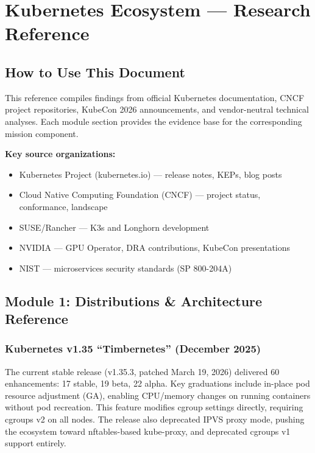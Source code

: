 \documentclass[11pt,letterpaper]{article}
\newcommand{\stageheader}[2]{%
  \noindent\colorbox{#2}{\makebox[\textwidth][l]{%
    \textcolor{white}{\bfseries\sffamily\hspace{6pt}#1\hspace{6pt}}}}%
  \vspace{0.5em}\par%
}
\begin{document}
\newpage

\stageheader{STAGE 2 --- RESEARCH REFERENCE}{secondary}

\section{Kubernetes Ecosystem --- Research Reference}

\subsection{How to Use This Document}

This reference compiles findings from official Kubernetes documentation, CNCF project repositories, KubeCon 2026 announcements, and vendor-neutral technical analyses. Each module section provides the evidence base for the corresponding mission component.

\textbf{Key source organizations:}
\begin{itemize}[leftmargin=2em]
\item Kubernetes Project (kubernetes.io) --- release notes, KEPs, blog posts
\item Cloud Native Computing Foundation (CNCF) --- project status, conformance, landscape
\item SUSE/Rancher --- K3s and Longhorn development
\item NVIDIA --- GPU Operator, DRA contributions, KubeCon presentations
\item NIST --- microservices security standards (SP 800-204A)
\end{itemize}

\subsection{Module 1: Distributions \& Architecture Reference}

\subsubsection{Kubernetes v1.35 ``Timbernetes'' (December 2025)}
The current stable release (v1.35.3, patched March 19, 2026) delivered 60 enhancements: 17 stable, 19 beta, 22 alpha. Key graduations include in-place pod resource adjustment (GA), enabling CPU/memory changes on running containers without pod recreation. This feature modifies cgroup settings directly, requiring cgroups v2 on all nodes. The release also deprecated IPVS proxy mode, pushing the ecosystem toward nftables-based kube-proxy, and deprecated cgroups v1 support entirely.
\end{document}
